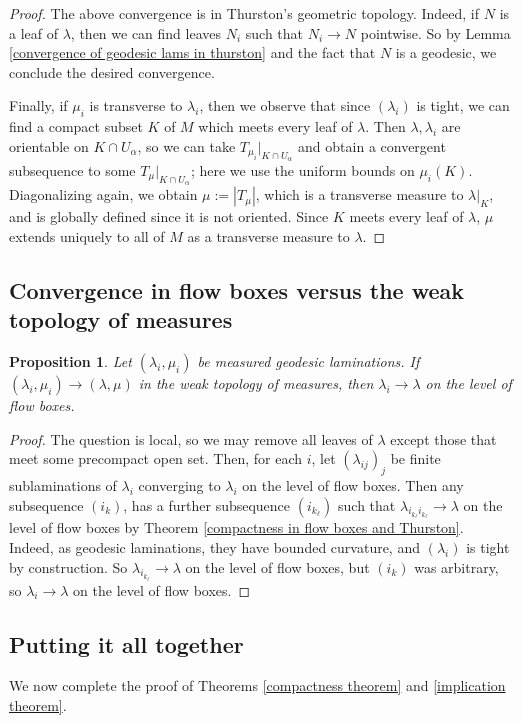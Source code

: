\documentclass[reqno,11pt]{amsart}
\newtheorem{proposition}[theorem]{Proposition}
\theoremstyle{definition}
\numberwithin{equation}{section}
\begin{document}
\begin{proof}
The above convergence is in Thurston's geometric topology.
Indeed, if $N$ is a leaf of $\lambda$, then we can find leaves $N_i$ such that $N_i \to N$ pointwise.
So by Lemma \ref{convergence of geodesic lams in thurston} and the fact that $N$ is a geodesic, we conclude the desired convergence.

Finally, if $\mu_i$ is transverse to $\lambda_i$, then we observe that since $(\lambda_i)$ is tight, we can find a compact subset $K$ of $M$ which meets every leaf of $\lambda$.
Then $\lambda, \lambda_i$ are orientable on $K \cap U_\alpha$, so we can take $T_{\mu_i}|_{K \cap U_\alpha}$ and obtain a convergent subsequence to some $T_\mu|_{K \cap U_\alpha}$; here we use the uniform bounds on $\mu_i(K)$.
Diagonalizing again, we obtain $\mu := |T_\mu|$, which is a transverse measure to $\lambda|_K$, and is globally defined since it is not oriented.
Since $K$ meets every leaf of $\lambda$, $\mu$ extends uniquely to all of $M$ as a transverse measure to $\lambda$.
\end{proof}

\subsection{Convergence in flow boxes versus the weak topology of measures}
\begin{proposition}\label{measures implies flow boxes}
Let $(\lambda_i, \mu_i)$ be measured geodesic laminations.
If $(\lambda_i, \mu_i) \to (\lambda, \mu)$ in the weak topology of measures, then $\lambda_i \to \lambda$ on the level of flow boxes.
\end{proposition}
\begin{proof}
The question is local, so we may remove all leaves of $\lambda$ except those that meet some precompact open set.
Then, for each $i$, let $(\lambda_{ij})_j$ be finite sublaminations of $\lambda_i$ converging to $\lambda_i$ on the level of flow boxes.
Then any subsequence $(i_k)$, has a further subsequence $(i_{k_\ell})$ such that $\lambda_{i_{k_\ell} i_{k_\ell}} \to \lambda$ on the level of flow boxes by Theorem \ref{compactness in flow boxes and Thurston}.
Indeed, as geodesic laminations, they have bounded curvature, and $(\lambda_i)$ is tight by construction.
So $\lambda_{i_{k_\ell}} \to \lambda$ on the level of flow boxes, but $(i_k)$ was arbitrary, so $\lambda_i \to \lambda$ on the level of flow boxes.
\end{proof}

\subsection{Putting it all together}
We now complete the proof of Theorems \ref{compactness theorem} and \ref{implication theorem}.
\end{document}
